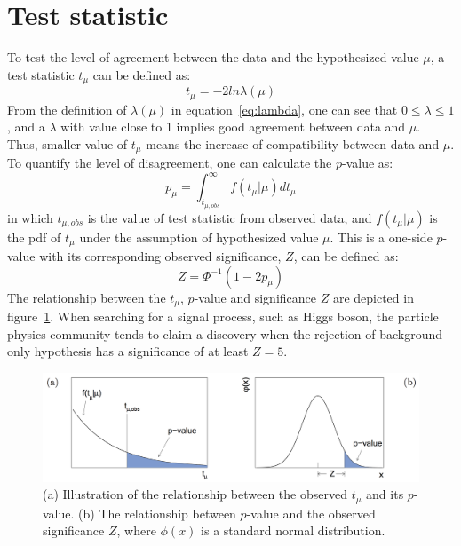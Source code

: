 \section{Test statistic}

To test the level of agreement between the data and the hypothesized value $\mu$, a test statistic $t_{\mu}$ can be defined as:
\begin{equation}
    t_{\mu} = -2 ln \lambda (\mu)
\end{equation}
From the definition of $\lambda(\mu)$ in equation~\ref{eq:lambda}, one can see that $0 \le \lambda \le 1$,
and a $\lambda$ with value close to 1 implies good agreement between data and $\mu$.
Thus, smaller value of $t_{\mu}$ means the increase of compatibility between data and $\mu$.
To quantify the level of disagreement, one can calculate the $p$-value as:
\begin{equation}
    p_{\mu} = \int_{t_{\mu, obs}}^{\infty} f(t_{\mu}|\mu) d t_{\mu}
\end{equation}
in which $t_{\mu, obs}$ is the value of test statistic from observed data, 
and $f(t_{\mu}|\mu)$ is the pdf of $t_{\mu}$ under the assumption of hypothesized value $\mu$.
This is a one-side $p$-value with its corresponding observed significance, $Z$, can be defined as:
\begin{equation}
    Z = \Phi^{-1}(1-2p_{\mu})
\end{equation}
The relationship between the $t_{\mu}$, $p$-value and significance $Z$ are depicted in figure~\ref{fig:pvalue_Z}.
When searching for a signal process, such as Higgs boson, the particle physics community tends to claim a discovery
when the rejection of background-only hypothesis has a significance of at least $Z = 5$.

\begin{figure}[!htbp]
\begin{center}
\includegraphics[width=1.0\textwidth]{figures/Statistic/test_statistic_pvalue_Z.png}
\end{center}
\caption{(a) Illustration of the relationship between the observed $t_{\mu}$ and its $p$-value. 
         (b) The relationship between $p$-value and the observed significance $Z$, where $\phi(x)$ is a standard normal distribution.
        }
\label{fig:pvalue_Z}
\end{figure}

